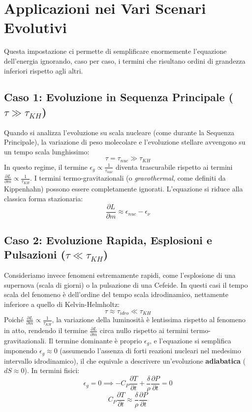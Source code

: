 \section{Applicazioni nei Vari Scenari Evolutivi}

Questa impostazione ci permette di semplificare enormemente l'equazione dell'energia ignorando, caso per caso, i termini che risultano ordini di grandezza inferiori rispetto agli altri.

\subsection{Caso 1: Evoluzione in Sequenza Principale ($\tau \gg \tau_{KH}$)}
Quando si analizza l'evoluzione su scala nucleare (come durante la Sequenza Principale), la variazione di peso molecolare e l'evoluzione stellare avvengono su un tempo scala lunghissimo:
\begin{equation}
\tau = \tau_{nuc} \gg \tau_{KH}
\end{equation}
In questo regime, il termine $\epsilon_g \propto \frac{1}{\tau_{nuc}}$ diventa trascurabile rispetto ai termini $\frac{\partial L}{\partial m} \propto \frac{1}{\tau_{KH}}$. I termini termo-gravitazionali (o \textit{gravothermal}, come definiti da Kippenhahn) possono essere completamente ignorati. L'equazione si riduce alla classica forma stazionaria:
\begin{equation}
\frac{\partial L}{\partial m} \approx \epsilon_{nuc} - \epsilon_{\nu}
\end{equation}

\subsection{Caso 2: Evoluzione Rapida, Esplosioni e Pulsazioni ($\tau \ll \tau_{KH}$)}
Consideriamo invece fenomeni estremamente rapidi, come l'esplosione di una supernova (scala di giorni) o la pulsazione di una Cefeide. In questi casi il tempo scala del fenomeno è dell'ordine del tempo scala idrodinamico, nettamente inferiore a quello di Kelvin-Helmholtz:
\begin{equation}
\tau \approx \tau_{idro} \ll \tau_{KH}
\end{equation}
Poiché $\frac{\partial L}{\partial m} \propto \frac{1}{\tau_{KH}}$, la variazione della luminosità è lentissima rispetto al fenomeno in atto, rendendo il termine $\frac{\partial L}{\partial m}$ circa nullo rispetto ai termini termo-gravitazionali. Il termine dominante è proprio $\epsilon_g$, e l'equazione si semplifica imponendo $\epsilon_g \approx 0$ (assumendo l'assenza di forti reazioni nucleari nel medesimo intervallo idrodinamico), il che equivale a descrivere un'evoluzione \textbf{adiabatica} ($dS \approx 0$). In termini fisici:
\begin{equation}
\epsilon_g = 0 \implies -C_P \frac{\partial T}{\partial t} + \frac{\delta}{\rho} \frac{\partial P}{\partial t} = 0
\end{equation}
\begin{equation}
C_P \frac{\partial T}{\partial t} \approx \frac{\delta}{\rho} \frac{\partial P}{\partial t}
\end{equation}

